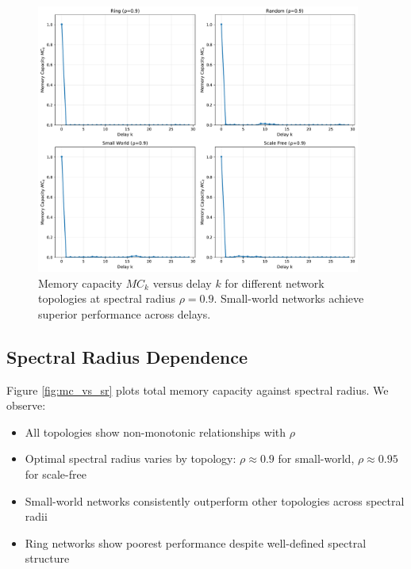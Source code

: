 \documentclass[11pt]{article}
\begin{document}
\begin{figure}[t]
\centering
\includegraphics[width=0.95\textwidth]{memory_capacity_by_topology.pdf}
\caption{Memory capacity $MC_k$ versus delay $k$ for different network topologies at spectral radius $\rho=0.9$. Small-world networks achieve superior performance across delays.}
\label{fig:mc_topology}
\end{figure}

\subsection{Spectral Radius Dependence}

Figure \ref{fig:mc_vs_sr} plots total memory capacity against spectral radius. We observe:

\begin{itemize}
\item All topologies show non-monotonic relationships with $\rho$
\item Optimal spectral radius varies by topology: $\rho \approx 0.9$ for small-world, $\rho \approx 0.95$ for scale-free
\item Small-world networks consistently outperform other topologies across spectral radii
\item Ring networks show poorest performance despite well-defined spectral structure
\end{itemize}
\end{document}
